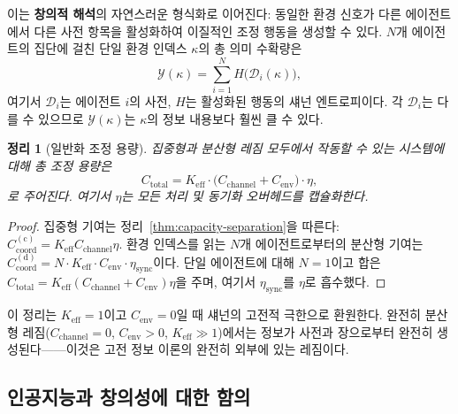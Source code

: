 \documentclass[12pt,a4paper]{article}
\newtheorem{theorem}{정리}[section]
\begin{document}
	이는 \textbf{창의적 해석}의 자연스러운 형식화로 이어진다: 동일한 환경 신호가 다른 에이전트에서 다른 사전 항목을 활성화하여 이질적인 조정 행동을 생성할 수 있다. $N$개 에이전트의 집단에 걸친 단일 환경 인덱스 $\kappa$의 총 의미 수확량은
	\begin{equation}
		\mathcal{Y}(\kappa) = \sum_{i=1}^{N} H\bigl(\mathcal{D}_i(\kappa)\bigr),
		\label{eq:semantic-yield}
	\end{equation}
	여기서 $\mathcal{D}_i$는 에이전트 $i$의 사전, $H$는 활성화된 행동의 섀넌 엔트로피이다. 각 $\mathcal{D}_i$는 다를 수 있으므로 $\mathcal{Y}(\kappa)$는 $\kappa$의 정보 내용보다 훨씬 클 수 있다.
	
	\begin{theorem}[일반화 조정 용량]
		집중형과 분산형 레짐 모두에서 작동할 수 있는 시스템에 대해 총 조정 용량은
		\begin{equation}
			\boxed{C_{\mathrm{total}} = K_{\mathrm{eff}} \cdot \bigl( C_{\mathrm{channel}} + C_{\mathrm{env}} \bigr) \cdot \eta},
			\label{eq:generalized-capacity}
		\end{equation}
		로 주어진다. 여기서 $\eta$는 모든 처리 및 동기화 오버헤드를 캡슐화한다.
	\end{theorem}
	
	\begin{proof}
		집중형 기여는 정리~\ref{thm:capacity-separation}을 따른다: $C_{\mathrm{coord}}^{\mathrm{(c)}} = K_{\mathrm{eff}} C_{\mathrm{channel}} \eta$. 환경 인덱스를 읽는 $N$개 에이전트로부터의 분산형 기여는 $C_{\mathrm{coord}}^{\mathrm{(d)}} = N \cdot K_{\mathrm{eff}} \cdot C_{\mathrm{env}} \cdot \eta_{\mathrm{sync}}$이다. 단일 에이전트에 대해 $N=1$이고 합은 $C_{\mathrm{total}} = K_{\mathrm{eff}}(C_{\mathrm{channel}} + C_{\mathrm{env}})\eta$을 주며, 여기서 $\eta_{\mathrm{sync}}$를 $\eta$로 흡수했다.
	\end{proof}
	
	이 정리는 $K_{\mathrm{eff}} = 1$이고 $C_{\mathrm{env}} = 0$일 때 섀넌의 고전적 극한으로 환원한다. 완전히 분산형 레짐($C_{\mathrm{channel}} = 0$, $C_{\mathrm{env}} > 0$, $K_{\mathrm{eff}} \gg 1$)에서는 정보가 사전과 장으로부터 완전히 생성된다——이것은 고전 정보 이론의 완전히 외부에 있는 레짐이다.
	
	\subsection{인공지능과 창의성에 대한 함의}
	\label{subsec:AI-dypsdc}
	
\end{document}

